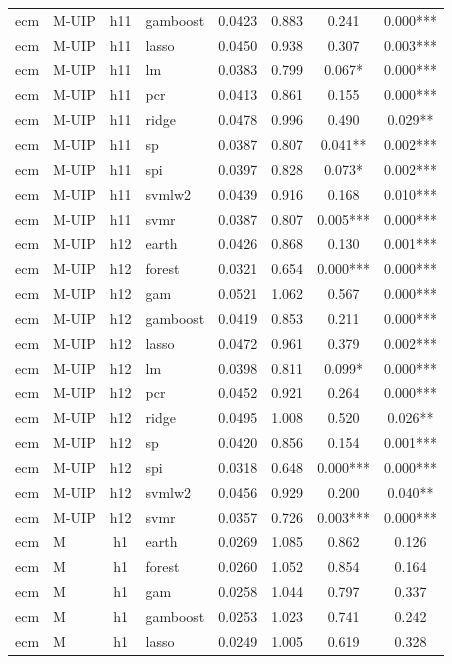 \begin{ThreePartTable}
\begin{longtable}[t]{llclcccc}
ecm & M-UIP & h11 & gamboost & 0.0423 & 0.883 & 0.241 & 0.000***\\
ecm & M-UIP & h11 & lasso & 0.0450 & 0.938 & 0.307 & 0.003***\\
ecm & M-UIP & h11 & lm & 0.0383 & 0.799 & 0.067* & 0.000***\\
ecm & M-UIP & h11 & pcr & 0.0413 & 0.861 & 0.155 & 0.000***\\
ecm & M-UIP & h11 & ridge & 0.0478 & 0.996 & 0.490 & 0.029**\\
ecm & M-UIP & h11 & sp & 0.0387 & 0.807 & 0.041** & 0.002***\\
ecm & M-UIP & h11 & spi & 0.0397 & 0.828 & 0.073* & 0.002***\\
ecm & M-UIP & h11 & svmlw2 & 0.0439 & 0.916 & 0.168 & 0.010***\\
ecm & M-UIP & h11 & svmr & 0.0387 & 0.807 & 0.005*** & 0.000***\\
\addlinespace
ecm & M-UIP & h12 & earth & 0.0426 & 0.868 & 0.130 & 0.001***\\
ecm & M-UIP & h12 & forest & 0.0321 & 0.654 & 0.000*** & 0.000***\\
ecm & M-UIP & h12 & gam & 0.0521 & 1.062 & 0.567 & 0.000***\\
ecm & M-UIP & h12 & gamboost & 0.0419 & 0.853 & 0.211 & 0.000***\\
ecm & M-UIP & h12 & lasso & 0.0472 & 0.961 & 0.379 & 0.002***\\
ecm & M-UIP & h12 & lm & 0.0398 & 0.811 & 0.099* & 0.000***\\
ecm & M-UIP & h12 & pcr & 0.0452 & 0.921 & 0.264 & 0.000***\\
ecm & M-UIP & h12 & ridge & 0.0495 & 1.008 & 0.520 & 0.026**\\
ecm & M-UIP & h12 & sp & 0.0420 & 0.856 & 0.154 & 0.001***\\
ecm & M-UIP & h12 & spi & 0.0318 & 0.648 & 0.000*** & 0.000***\\
ecm & M-UIP & h12 & svmlw2 & 0.0456 & 0.929 & 0.200 & 0.040**\\
ecm & M-UIP & h12 & svmr & 0.0357 & 0.726 & 0.003*** & 0.000***\\
\addlinespace
ecm & M & h1 & earth & 0.0269 & 1.085 & 0.862 & 0.126\\
ecm & M & h1 & forest & 0.0260 & 1.052 & 0.854 & 0.164\\
ecm & M & h1 & gam & 0.0258 & 1.044 & 0.797 & 0.337\\
ecm & M & h1 & gamboost & 0.0253 & 1.023 & 0.741 & 0.242\\
ecm & M & h1 & lasso & 0.0249 & 1.005 & 0.619 & 0.328\\

\end{longtable}
\end{ThreePartTable}
